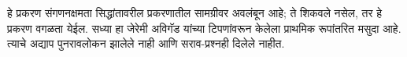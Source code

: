 \documentclass[../../../include/open-logic-chapter]{subfiles}
\begin{document}
\begin{editorial}
  हे प्रकरण संगणनक्षमता सिद्धांतावरील प्रकरणातील सामग्रीवर
  अवलंबून आहे; ते शिकवले नसेल, तर हे प्रकरण वगळता येईल.
  सध्या हा जेरेमी अविगॅड यांच्या टिपणांवरून केलेला प्राथमिक
  रूपांतरित मसुदा आहे. त्याचे अद्याप पुनरावलोकन झालेले नाही
  आणि सराव-प्रश्नही दिलेले नाहीत.
\end{editorial}












\OLEndChapterHook
\end{document}
